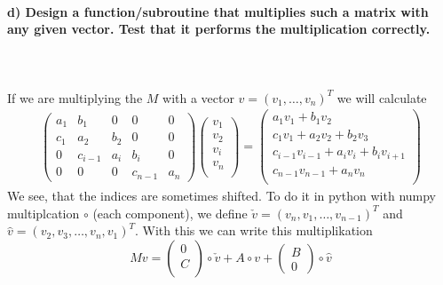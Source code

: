 \paragraph{
    d) Design a function/subroutine that multiplies such a matrix with 
    any given vector. Test that it performs the multiplication correctly.
} \ \\
    \\
    If we are multiplying the $M$ with a vector $v = (v_1, \dots, v_n)^T$ we will calculate
    \begin{align}
    \begin{pmatrix}
    a_1 & b_1 & 0      & 0       & 0 \\        
    c_1 & a_2 & b_2    & 0       & 0 \\        
    0   & c_{i-1} & a_i & b_i    &0    \\
    0   & 0   & 0      & c_{n-1} & a_n
    \end{pmatrix} 
    \begin{pmatrix}
    v_1 \\ v_2 \\v_i \\ v_n\\
    \end{pmatrix}
    =
    \begin{pmatrix}
    a_1 v_1 + b_1 v_2 \\
    c_1 v_1 + a_2 v_2 + b_2 v_3 \\
    c_{i-1} v_{i-1} + a_i v_i + b_i v_{i+1} \\
    c_{n-1} v_{n-1} + a_n v_n\\
    \end{pmatrix}	
    \end{align}
    We see, that the indices are sometimes shifted. To do it in python with numpy multiplcation $\circ$ (each component), we define $\check{v} = (v_n, v_1, \dots, v_{n-1})^T$ and $\hat{v} = (v_2, v_3, \dots, v_n , v_1)^T$. With this we can write this multiplikation
    \begin{equation}
    	Mv = 
    	\begin{pmatrix} 0 \\ C \\	\end{pmatrix}
    	\circ \check{v} + A \circ v + 
    	\begin{pmatrix} B \\ 0	\end{pmatrix} \circ \hat{v}
    \end{equation}  
    


